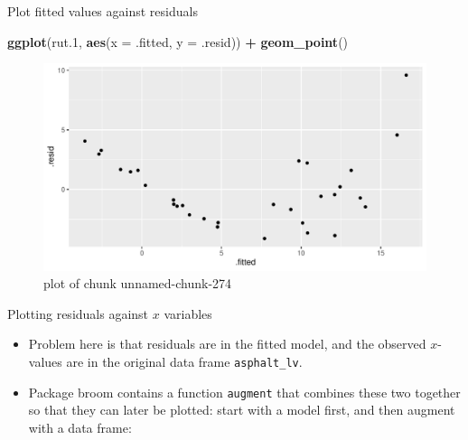 \documentclass[ignorenonframetext,]{beamer}
\newenvironment{Shaded}{\begin{snugshade}}{\end{snugshade}}
\newcommand{\DataTypeTok}[1]{\textcolor[rgb]{0.13,0.29,0.53}{#1}}
\newcommand{\FloatTok}[1]{\textcolor[rgb]{0.00,0.00,0.81}{#1}}
\newcommand{\KeywordTok}[1]{\textcolor[rgb]{0.13,0.29,0.53}{\textbf{#1}}}
\newcommand{\NormalTok}[1]{#1}
\newcommand{\OperatorTok}[1]{\textcolor[rgb]{0.81,0.36,0.00}{\textbf{#1}}}
\newcommand{\StringTok}[1]{\textcolor[rgb]{0.31,0.60,0.02}{#1}}
\providecommand{\tightlist}{%
  \setlength{\itemsep}{0pt}\setlength{\parskip}{0pt}}
\begin{document}
\begin{frame}[fragile]{Plot fitted values against residuals}
\protect\hypertarget{plot-fitted-values-against-residuals}{}

\begin{Shaded}
\begin{Highlighting}[]
\KeywordTok{ggplot}\NormalTok{(rut}\FloatTok{.1}\NormalTok{, }\KeywordTok{aes}\NormalTok{(}\DataTypeTok{x =}\NormalTok{ .fitted, }\DataTypeTok{y =}\NormalTok{ .resid)) }\OperatorTok{+}\StringTok{ }\KeywordTok{geom_point}\NormalTok{()}
\end{Highlighting}
\end{Shaded}

\begin{figure}
\centering
\includegraphics{figure/unnamed-chunk-274-1.pdf}
\caption{plot of chunk unnamed-chunk-274}
\end{figure}

\end{frame}

\begin{frame}[fragile]{Plotting residuals against \(x\) variables}
\protect\hypertarget{plotting-residuals-against-x-variables}{}

\begin{itemize}
\tightlist
\item
  Problem here is that residuals are in the fitted model, and the
  observed \(x\)-values are in the original data frame
  \texttt{asphalt\_lv}.
\item
  Package broom contains a function \texttt{augment} that combines these
  two together so that they can later be plotted: start with a model
  first, and then augment with a data frame:
\end{itemize}

\begin{Shaded}
\end{Shaded}

\end{frame}
\end{document}
